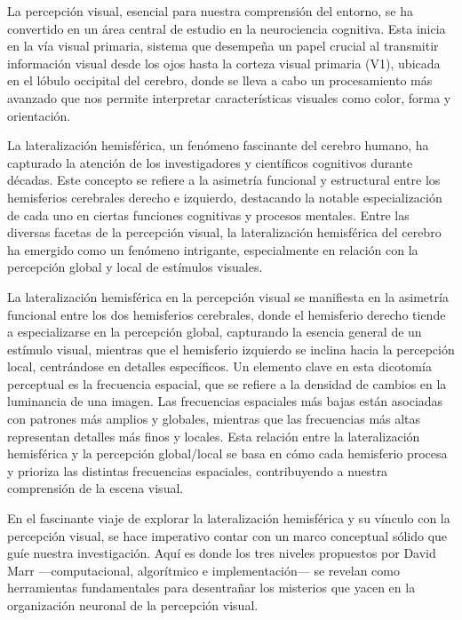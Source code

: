 \documentclass{article}
\begin{document}
	La percepción visual, esencial para nuestra comprensión del entorno, se ha convertido en un área central de estudio en la neurociencia cognitiva. Esta inicia en la vía visual primaria, sistema que desempeña un papel crucial al transmitir información visual desde los ojos hasta la corteza visual primaria (V1), ubicada en el lóbulo occipital del cerebro, donde se lleva a cabo un procesamiento más avanzado que nos permite interpretar características visuales como color, forma y orientación.
	
	La lateralización hemisférica, un fenómeno fascinante del cerebro humano, ha capturado la atención de los investigadores y científicos cognitivos durante décadas. Este concepto se refiere a la asimetría funcional y estructural entre los hemisferios cerebrales derecho e izquierdo, destacando la notable especialización de cada uno en ciertas funciones cognitivas y procesos mentales. Entre las diversas facetas de la percepción visual, la lateralización hemisférica del cerebro ha emergido como un fenómeno intrigante, especialmente en relación con la percepción global y local de estímulos visuales.
	
	La lateralización hemisférica en la percepción visual se manifiesta en la asimetría funcional entre los dos hemisferios cerebrales, donde el hemisferio derecho tiende a especializarse en la percepción global, capturando la esencia general de un estímulo visual, mientras que el hemisferio izquierdo se inclina hacia la percepción local, centrándose en detalles específicos. Un elemento clave en esta dicotomía perceptual es la frecuencia espacial, que se refiere a la densidad de cambios en la luminancia de una imagen. Las frecuencias espaciales más bajas están asociadas con patrones más amplios y globales, mientras que las frecuencias más altas representan detalles más finos y locales. Esta relación entre la lateralización hemisférica y la percepción global/local se basa en cómo cada hemisferio procesa y prioriza las distintas frecuencias espaciales, contribuyendo a nuestra comprensión de la escena visual.
	
	En el fascinante viaje de explorar la lateralización hemisférica y su vínculo con la percepción visual, se hace imperativo contar con un marco conceptual sólido que guíe nuestra investigación. Aquí es donde los tres niveles propuestos por David Marr —computacional, algorítmico e implementación— se revelan como herramientas fundamentales para desentrañar los misterios que yacen en la organización neuronal de la percepción visual.
	
\end{document}
